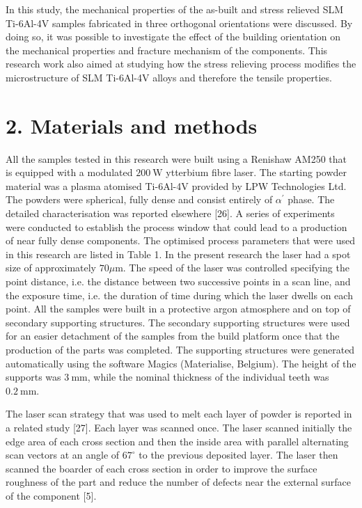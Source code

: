 \documentclass[10pt]{article}
\begin{document}
In this study, the mechanical properties of the as-built and stress relieved SLM Ti-6Al-4V samples fabricated in three orthogonal orientations were discussed. By doing so, it was possible to investigate the effect of the building orientation on the mechanical properties and fracture mechanism of the components. This research work also aimed at studying how the stress relieving process modifies the microstructure of SLM Ti-6Al-4V alloys and therefore the tensile properties.

\section*{2. Materials and methods}
All the samples tested in this research were built using a Renishaw AM250 that is equipped with a modulated $200 \mathrm{~W}$ ytterbium fibre laser. The starting powder material was a plasma atomised Ti-6Al-4V provided by LPW Technologies Ltd. The powders were spherical, fully dense and consist entirely of $\alpha^{\prime}$ phase. The detailed characterisation was reported elsewhere [26]. A series of experiments were conducted to establish the process window that could lead to a production of near fully dense components. The optimised process parameters that were used in this research are listed in Table 1. In the present research the laser had a spot size of approximately $70 \mu \mathrm{m}$. The speed of the laser was controlled specifying the point distance, i.e. the distance between two successive points in a scan line, and the exposure time, i.e. the duration of time during which the laser dwells on each point. All the samples were built in a protective argon atmosphere and on top of secondary supporting structures. The secondary supporting structures were used for an easier detachment of the samples from the build platform once that the production of the parts was completed. The supporting structures were generated automatically using the software Magics (Materialise, Belgium). The height of the supports was $3 \mathrm{~mm}$, while the nominal thickness of the individual teeth was $0.2 \mathrm{~mm}$.

The laser scan strategy that was used to melt each layer of powder is reported in a related study [27]. Each layer was scanned once. The laser scanned initially the edge area of each cross section and then the inside area with parallel alternating scan vectors at an angle of $67^{\circ}$ to the previous deposited layer. The laser then scanned the boarder of each cross section in order to improve the surface roughness of the part and reduce the number of defects near the external surface of the component [5].
\end{document}
